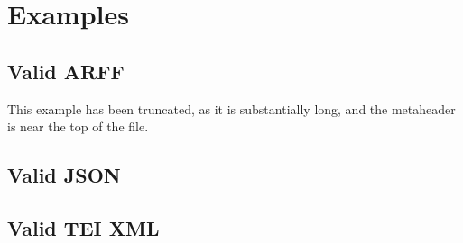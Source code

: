 \section{Examples}

\subsection{Valid ARFF}
This example has been truncated, as it is substantially long, and the metaheader is near the top of the file.


\subsection{Valid JSON}


\subsection{Valid TEI XML}
